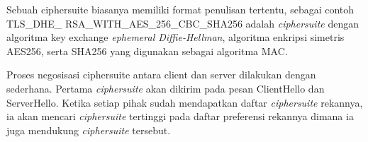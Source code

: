     Sebuah ciphersuite biasanya memiliki format penulisan tertentu, sebagai contoh TLS\_DHE\_ RSA\_WITH\_AES\_256\_CBC\_SHA256 adalah \textit{ciphersuite} dengan algoritma key exchange \textit{ephemeral Diffie-Hellman}, algoritma enkripsi simetris AES256, serta SHA256 yang digunakan sebagai algoritma MAC.

    Proses negosisasi ciphersuite antara client dan server dilakukan dengan sederhana. Pertama \textit{ciphersuite} akan dikirim pada pesan ClientHello dan ServerHello. Ketika setiap pihak sudah mendapatkan daftar \textit{ciphersuite} rekannya, ia akan mencari \textit{ciphersuite} tertinggi pada daftar preferensi rekannya dimana ia juga mendukung \textit{ciphersuite} tersebut.
